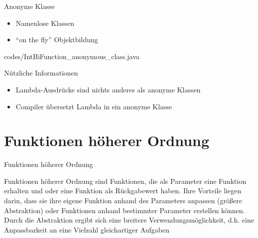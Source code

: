 \documentclass{../tuda-beamer}
\begin{document}
    \begin{frame}
        
    \end{frame}

    \begin{frame}{Anonyme Klasse}
        \begin{itemize}
            \item Namenlose Klassen
            \item \enquote{on the fly} Objektbildung
        \end{itemize}

        
        {codes/IntBiFunction_anonymous_class.java}
    \end{frame}

    \begin{frame}{Nützliche Informationen}
        \begin{itemize}
            \item Lambda-Ausdrücke sind nichts anderes als anonyme Klassen
            \item Compiler übersetzt Lambda in ein anonyme Klasse
        \end{itemize}

        
    \end{frame}


    \section{Funktionen höherer Ordnung}
    \begin{frame}[c]{Funktionen höherer Ordnung}
        \begin{note}[title=Information:]
            Funktionen höherer Ordnung sind Funktionen, die als Parameter eine Funktion erhalten
            und oder eine Funktion als Rückgabewert haben. Ihre Vorteile liegen darin, dass sie
            ihre eigene Funktion anhand des Parameters anpassen (größere Abstraktion) oder
            Funktionen anhand bestimmter Parameter erstellen können. Durch die Abstraktion ergibt
            sich eine breitere Verwendungsmöglichkeit, d.h. eine Anpassbarkeit an eine Vielzahl
            gleichartiger Aufgaben
        \end{note}
    \end{frame}
\end{document}
